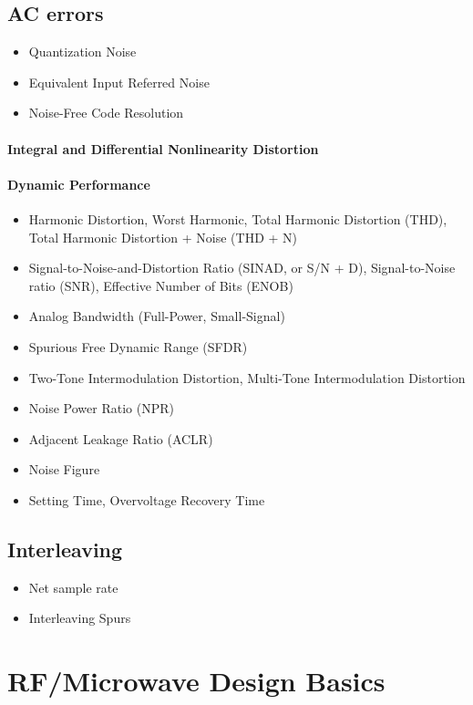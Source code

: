 \subsection{AC errors}
\begin{itemize}
\item Quantization Noise
\item Equivalent Input Referred Noise
\item Noise-Free Code Resolution
\end{itemize}
\paragraph{Integral and Differential Nonlinearity Distortion} 

\paragraph{Dynamic Performance}

\begin{itemize}
\item Harmonic Distortion, Worst Harmonic, Total Harmonic Distortion (THD), Total Harmonic Distortion + Noise (THD + N)
\item Signal-to-Noise-and-Distortion Ratio (SINAD, or S/N + D), Signal-to-Noise ratio (SNR), Effective Number of Bits (ENOB)
\item Analog Bandwidth (Full-Power, Small-Signal)
\item Spurious Free Dynamic Range (SFDR)
\item Two-Tone Intermodulation Distortion, Multi-Tone Intermodulation Distortion
\item Noise Power Ratio (NPR)
\item Adjacent Leakage Ratio (ACLR)
\item Noise Figure
\item Setting Time, Overvoltage Recovery Time
\end{itemize}

\cite{walt}
\subsection{Interleaving}

\begin{itemize}
\item Net sample rate
\item Interleaving Spurs
\end{itemize}

\cite{mangrob}



\newpage
\section{RF/Microwave Design Basics}